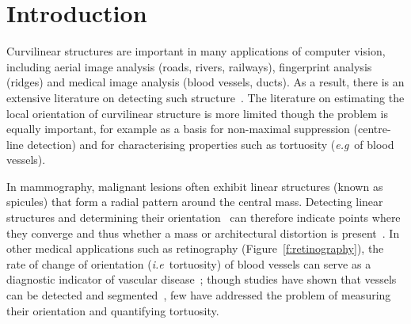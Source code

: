 \documentclass{bmvc2k}
\title{\ttl}
\def\eg{\emph{e.g}\bmvaOneDot}
\def\ie{\emph{i.e}\bmvaOneDot}
\newcommand{\fref}[1]{Figure~\ref{#1}}
\begin{document}
\maketitle

\begin{abstract}
Estimating orientation of image structure underpins applications including digital mammography, retinography, fingerprint analysis and many more. We consider different choices of filter bank including those based on first and second derivatives, efficient Haar-like features and the Dual Tree Complex Wavelet Transform. We then investigate how standard regressors (linear regression, Boosting and Random Forests) may be adapted to use the responses to these filter banks in order to predict orientation of image structure. For a quantitative evaluation, we use synthetic images based on mammograms and the publicly available DRIVE database of retinal images, and show that Random Forests and the wavelet transform offer superior accuracy though at a cost in efficiency. Qualitative results are also presented for real mammograms and fingerprint images.
\end{abstract}


\def\figpath{./figs}

\section{Introduction}
\label{s:introduction}
Curvilinear structures are important in many applications of computer vision, including aerial image analysis (roads, rivers, railways), fingerprint analysis (ridges) and medical image analysis (blood vessels, ducts). As a result, there is an extensive literature on detecting such structure~\cite{Papari_Petkov_IVC11}. The literature on estimating the local orientation of curvilinear structure is more limited though the problem is equally important, for example as a basis for non-maximal suppression (centre-line detection) and for characterising properties such as tortuosity (\eg~of blood vessels).

In mammography, malignant lesions often exhibit linear structures (known as spicules) that form a radial pattern around the central mass. Detecting linear structures and determining their orientation~\cite{Zwiggelaar_etal_MIA99,Zwiggelaar_etal_TMI04} can therefore indicate points where they converge and thus whether a mass or architectural distortion is present~\cite{Karssemeijer_teBrake_TMI96,Rangayyan_Ayres_MBEC06}. In other medical applications such as retinography (\fref{f:retinography}), the rate of change of orientation (\ie~tortuosity) of blood vessels can serve as a diagnostic indicator of vascular disease~\cite{Hart_etal_IJMI99}; though studies have shown that vessels can be detected and segmented~\cite{Staal_etal_TMI04,Ricci_Perfetti_TMI07,Dabbah_etal_MICCAI10}, few have addressed the problem of measuring their orientation and quantifying tortuosity.
\end{document}
